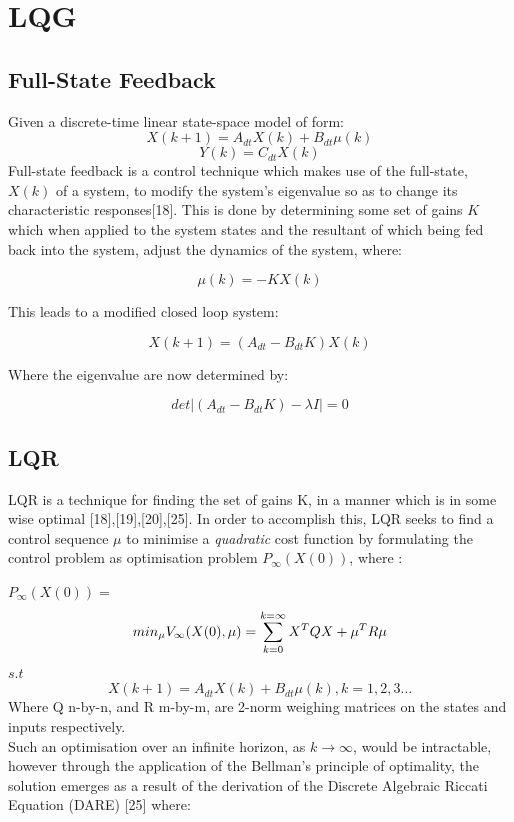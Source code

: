 \documentclass[12pt,a4paper,twoside]{report}
\begin{document}
		\section{LQG}
		
			\subsection{Full-State Feedback}
			
				Given a discrete-time linear state-space model of form:
				\[
					X(k+1) = A_{dt}X(k) + B_{dt} \mu(k)
				\]
				\[
					Y(k) = C_{dt} X(k)
				\]
				Full-state feedback is a control technique which makes use of the full-state, $X(k)$ of a system, to modify the system's eigenvalue so as to change its characteristic responses[18]. This is done by determining some set of gains $K$ which when applied to the system states and the resultant of which being fed back into the system, adjust the dynamics of the system, where:
				
				\begin{equation}
					\mu(k) = -K X(k)
				\end{equation}
				
				This leads to a modified closed loop system:
				
				\begin{equation}
					X(k+1) = (A_{dt}-B_{dt}K) X(k)
				\end{equation}
				
				Where the eigenvalue are now determined by:
				
				\begin{equation}
					det|(A_{dt}-B_{dt}K) - \lambda I| = 0
				\end{equation}
				
			\subsection{LQR}
				
				LQR is a technique for finding the set of gains K, in a manner which is in some wise optimal [18],[19],[20],[25]. In order to accomplish this, LQR seeks to find a control sequence \emph{\emph{$\mu$}} to minimise a \emph{quadratic} cost function by formulating the control problem as optimisation problem \(P_\infty(X(0))\), where :
				
				\(P_\infty(X(0)) = \)				
				\begin{equation}
					min_\mu  V_\infty(X(0),\emph{\emph{$\mu$}}) = \sum_{k = 0}^{k = \infty} X^{T} Q X + \mu^{T} R \mu
				\end{equation}
				\(s.t\)
				\[
					X(k+1) = A_{dt}X(k) + B_{dt} \mu(k) , k=1,2,3\dots
				\]
				Where Q n-by-n, and R m-by-m, are 2-norm weighing matrices on the states and inputs respectively.
				\\
				Such an optimisation over an infinite horizon, as \(k \to \infty \), would be intractable, however through the application of the Bellman's principle of optimality, the solution emerges as a result of the derivation of the Discrete Algebraic Riccati Equation (DARE) [25] where:
				
\end{document}

